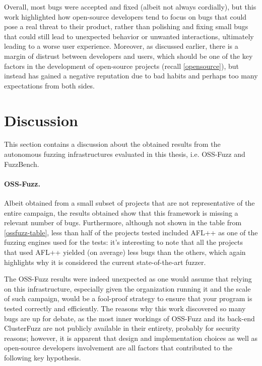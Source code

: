 Overall, most bugs were accepted and fixed (albeit not always cordially), but this work highlighted how open-source developers tend to focus on bugs that could pose a real threat to their product, rather than polishing and fixing small bugs that could still lead to unexpected behavior or unwanted interactions, ultimately leading to a worse user experience. Moreover, as discussed earlier, there is a margin of distrust between developers and users, which should be one of the key factors in the development of open-source projects (recall \ref{opensource}), but instead has gained a negative reputation due to bad habits and perhaps too many expectations from both sides.







\newpage
\section{Discussion}
This section contains a discussion about the obtained results from the autonomous fuzzing infrastructures evaluated in this thesis, i.e. OSS-Fuzz and FuzzBench.

\paragraph{OSS-Fuzz.} Albeit obtained from a small subset of projects that are not representative of the entire campaign, the results obtained show that this framework is missing a relevant number of bugs. Furthermore, although not shown in the table from \ref{ossfuzz-table}, less than half of the projects tested included AFL++ as one of the fuzzing engines used for the tests: it's interesting to note that all the projects that used AFL++ yielded (on average) less bugs than the others, which again highlights why it is considered the current state-of-the-art fuzzer.

The OSS-Fuzz results were indeed unexpected as one would assume that relying on this infrastructure, especially given the organization running it and the scale of such campaign, would be a fool-proof strategy to ensure that your program is tested correctly and efficiently. The reasons why this work discovered so many bugs are up for debate, as the most inner workings of OSS-Fuzz and its back-end ClusterFuzz are not publicly available in their entirety, probably for security reasons; however, it is apparent that design and implementation choices as well as open-source developers involvement are all factors that contributed to the following key hypothesis.

